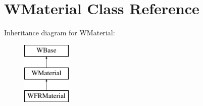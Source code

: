 \hypertarget{class_w_material}{}\section{W\+Material Class Reference}
\label{class_w_material}
Inheritance diagram for W\+Material\+:\begin{figure}[H]
\begin{center}
\leavevmode
\includegraphics[height=3.000000cm]{class_w_material}
\end{center}
\end{figure}
